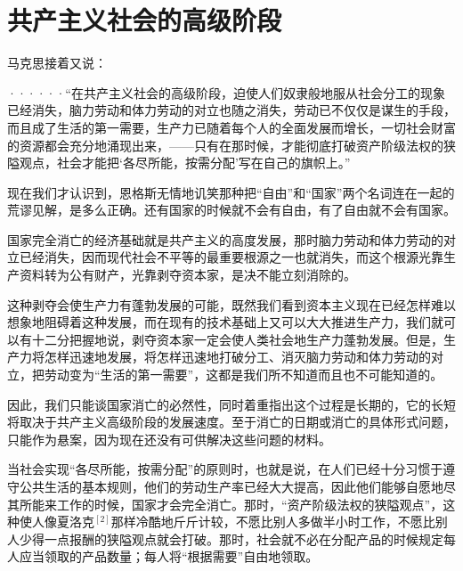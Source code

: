 \chapter{共产主义社会的高级阶段} %

马克思接着又说：

\pskip
\leftskip=10mm
\small

······“在共产主义社会的高级阶段，迫使人们奴隶般地服从社会分工的现象已经消失，脑力劳动和体力劳动的对立也随之消失，劳动已不仅仅是谋生的手段，而且成了生活的第一需要，生产力已随着每个人的全面发展而增长，一切社会财富的资源都会充分地涌现出来，——只有在那时候，才能彻底打破资产阶级法权的狭隘观点，社会才能把‘各尽所能，按需分配’写在自己的旗帜上。”

\pskip
\leftskip=0mm
\normalsize

现在我们才认识到，恩格斯无情地讥笑那种把“自由”和“国家”两个名词连在一起的荒谬见解，是多么正确。还有国家的时候就不会有自由，有了自由就不会有国家。

国家完全消亡的经济基础就是共产主义的高度发展，那时脑力劳动和体力劳动的对立已经消失，因而现代{\kaishu 社会}不平等的最重要根源之一也就消失，而这个根源光靠生产资料转为公有财产，光靠剥夺资本家，是决不能立刻消除的。

这种剥夺会使生产力有蓬勃发展的{\kaishu 可能}，既然我们看到资本主义现在已经怎样难以想象地{\kaishu 阻碍着}这种发展，而在现有的技术基础上又可以大大推进生产力，我们就可以有十二分把握地说，剥夺资本家一定会使人类社会地生产力蓬勃发展。但是，生产力将怎样迅速地发展，将怎样迅速地打破分工、消灭脑力劳动和体力劳动的对立，把劳动变为“生活的第一需要”，这都是我们所不知道而且也{\kaishu 不可能}知道的。

因此，我们只能谈国家消亡的必然性，同时着重指出这个过程是长期的，它的长短将取决于共产主义{\kaishu 高级阶段}的发展速度。至于消亡的日期或消亡的具体形式问题，只能作为悬案，因为现在还{\kaishu 没有}可供解决这些问题的材料。

当社会实现“各尽所能，按需分配”的原则时，也就是说，在人们已经十分习惯于遵守公共生活的基本规则，他们的劳动生产率已经大大提高，因此他们能够自愿地{\kaishu 尽其所能}来工作的时候，国家才会完全消亡。那时，“资产阶级法权的狭隘观点”，这种使人像夏洛克$^{[2]}$那样冷酷地斤斤计较，不愿比别人多做半小时工作，不愿比别人少得一点报酬的狭隘观点就会打破。那时，社会就不必在分配产品的时候规定每人应当领取的产品数量；每人将“根据需要”自由地领取。


